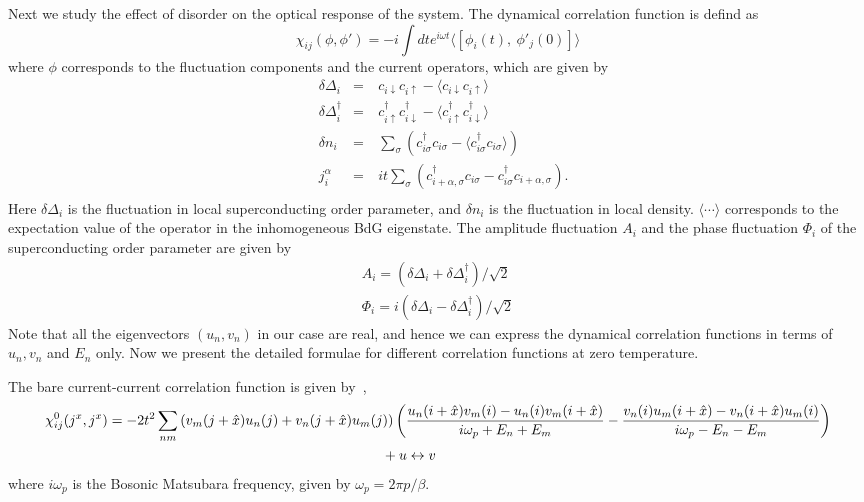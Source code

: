 \documentclass[Colective.tex]{revtex4-1}
\begin{document}
Next we study the effect of disorder on the optical response of the system. The dynamical correlation function is defind as \cite{cea2014}
\begin{equation}
\chi_{ij}(\phi,\phi')=-i \int dt e^{i\omega t} \langle \left[\phi_i(t),\ \phi'_j(0)\right] \rangle
\label{eq.cor_fun}
\end{equation} 
where $\phi$ corresponds to the fluctuation components and the current operators, which are given by \cite{cea2014}
\begin{equation}
\begin{aligned}
&\delta\Delta_i &=\ &c_{i\downarrow}c_{i\uparrow} - \langle c_{i\downarrow}c_{i\uparrow} \rangle \\
&\delta\Delta_i^\dagger &=\ &c_{i\uparrow}^\dagger c_{i\downarrow}^\dagger - \langle c_{i\uparrow}^\dagger c_{i\downarrow}^\dagger \rangle \\
&\delta n_i &=\ &\sum_{\sigma} \left( c_{i\sigma}^\dagger c_{i\sigma} - \langle c_{i\sigma}^\dagger c_{i\sigma} \rangle \right) \\
&j_i^\alpha &=\ &it \sum_{\sigma} \left( c_{i+\alpha,\sigma}^\dagger c_{i\sigma} - c_{i\sigma}^\dagger c_{i+\alpha,\sigma} \right). \\
\end{aligned}
\label{eq.fluct_curr}
\end{equation} 
Here $\delta\Delta_i$ is the fluctuation in local superconducting order parameter, and $\delta n_i$ is the fluctuation in local density. $\langle\cdots\rangle$ corresponds to the expectation value of the operator in the inhomogeneous BdG eigenstate. The amplitude fluctuation $A_i$ and the phase fluctuation $\Phi_i$ of the superconducting order parameter are given by 
\begin{align}
A_i=(\delta\Delta_i+\delta\Delta_i^\dagger)/\sqrt{2} \label{eq.amp}\\
\Phi_i=i(\delta\Delta_i-\delta\Delta_i^\dagger)/\sqrt{2}
\label{eq.pha}
\end{align}
%
Note that all the eigenvectors $(u_n, v_n)$ in our case are real, and hence we can express the dynamical correlation functions in terms of $u_n, v_n$ and $E_n$ only. Now we present the detailed formulae for different correlation functions at zero temperature.

The bare current-current correlation function is given by~\cite{Ghosal2001},
\begin{eqnarray}
\nonumber \chi^0_{ij}(j^x,j^x) 
&= -2t^2\sum_{nm}\left(v_{m}(j+\hat x)u_{n}(j) + v_{n}(j+\hat x)u_{m}(j)\right) \left({\frac{u_n(i+\hat x)v_m(i) - u_n(i)v_m(i+\hat x)}{i\omega_p+E_n+E_m} } - {\frac{v_n(i)u_m(i+\hat x) - v_n(i+\hat x)u_{m}(i)}{i\omega_p-E_n-E_m} }\right) \nonumber\\ 
&~~~~~~~~~~~~~~~~~~~~~~~~~~~~~~~~~~~~~~~~~~~~~~~~~~~~~~~~~~~
+u\leftrightarrow v
\label{eq.bare_jj}
\end{eqnarray}
where $i\omega_p$ is the Bosonic Matsubara frequency, given by $\omega_p=2\pi p/\beta$. \\
\end{document}
